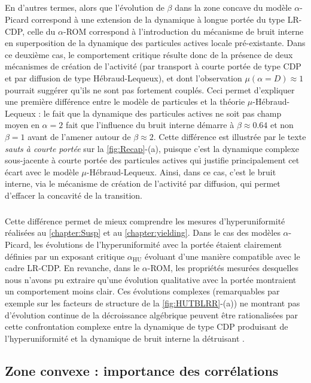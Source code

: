 \subparagraph{}En d'autres termes, alors que l'évolution de $\beta$ dans la zone concave du modèle $\alpha$-Picard correspond à une extension de la dynamique à longue portée du type LR-CDP, celle du $\alpha$-ROM correspond à l'introduction du mécanisme de bruit interne en superposition de la dynamique des particules actives locale pré-existante. Dans ce deuxième cas, le comportement critique résulte donc de la présence de deux mécanismes de création de l'activité (par transport à courte portée de type CDP et par diffusion de type Hébraud-Lequeux), et dont l'observation $\mu(\alpha = D) \approx 1$ pourrait suggérer qu'ils ne sont pas fortement couplés. Ceci permet d'expliquer une première différence entre le modèle de particules et la théorie $\mu$-Hébraud-Lequeux : le fait que la dynamique des particules actives ne soit pas champ moyen en $\alpha = 2$ fait que l'influence du bruit interne démarre à $\beta \approx 0.64$ et non $\beta = 1$ avant de l'amener autour de $\beta \approx 2$. Cette différence est illustrée par le texte \textit{sauts à courte portée} sur la \autoref{fig:Recap}-(a), puisque c'est la dynamique complexe sous-jacente à courte portée des particules actives qui justifie principalement cet écart avec le modèle $\mu$-Hébraud-Lequeux. Ainsi, dans ce cas, c'est le bruit interne, via le mécanisme de création de l'activité par diffusion, qui permet d'effacer la concavité de la transition.

\subparagraph{}Cette différence permet de mieux comprendre les mesures d'hyperuniformité réalisées au \autoref{chapter:Susp} et au \autoref{chapter:yielding}. Dans le cas des modèles $\alpha$-Picard, les évolutions de l'hyperuniformité avec la portée étaient clairement définies par un exposant critique $\alpha_\text{HU}$ évoluant d'une manière compatible avec le cadre LR-CDP. En revanche, dans le $\alpha$-ROM, les propriétés mesurées desquelles nous n'avons pu extraire qu'une évolution qualitative avec la portée montraient un comportement moins clair. Ces évolutions complexes (remarquables par exemple sur les facteurs de structure de la \autoref{fig:HUTBLRR}-(a)) ne montrant pas d'évolution continue de la décroissance algébrique peuvent être rationalisées par cette confrontation complexe entre la dynamique de type CDP produisant de l'hyperuniformité et la dynamique de bruit interne la détruisant \cite{mari_absorbing_2022}.

\FloatBarrier

\subsection{Zone convexe : importance des corrélations}

